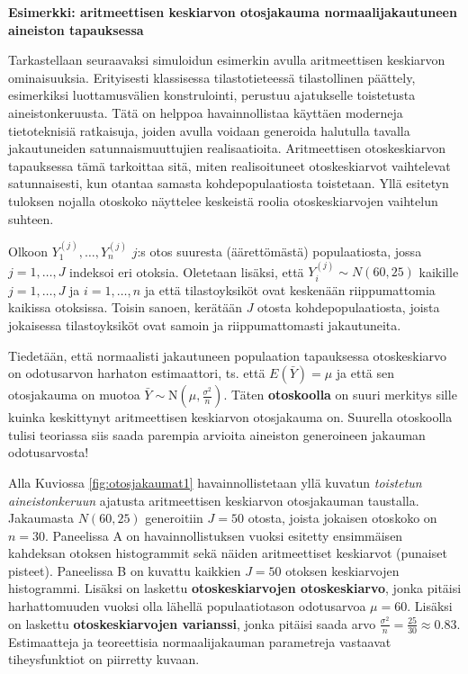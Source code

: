 \documentclass[
]{book}
\begin{document}
\begin{eblock}{}
\textbf{Esimerkki: aritmeettisen keskiarvon otosjakauma normaalijakautuneen aineiston tapauksessa}

Tarkastellaan seuraavaksi simuloidun esimerkin avulla aritmeettisen keskiarvon ominaisuuksia. Erityisesti klassisessa tilastotieteessä tilastollinen päättely, esimerkiksi luottamusvälien konstrulointi, perustuu ajatukselle toistetusta aineistonkeruusta. Tätä on helppoa havainnollistaa käyttäen moderneja tietoteknisiä ratkaisuja, joiden avulla voidaan generoida halutulla tavalla jakautuneiden satunnaismuuttujien realisaatioita. Aritmeettisen otoskeskiarvon tapauksessa tämä tarkoittaa sitä, miten realisoituneet otoskeskiarvot vaihtelevat satunnaisesti, kun otantaa samasta kohdepopulaatiosta toistetaan. Yllä esitetyn tuloksen nojalla otoskoko näyttelee keskeistä roolia otoskeskiarvojen vaihtelun suhteen.

Olkoon \(Y_1^{(j)},\dots,Y_n^{(j)}\) \(j\):s otos suuresta (äärettömästä) populaatiosta, jossa \(j=1,\dots,J\) indeksoi eri otoksia. Oletetaan lisäksi, että \(Y_i^{(j)} \sim N(60,25)\) kaikille \(j=1,\dots,J\) ja \(i=1,\dots,n\) ja että tilastoyksiköt ovat keskenään riippumattomia kaikissa otoksissa. Toisin sanoen, kerätään \(J\) otosta kohdepopulaatiosta, joista jokaisessa tilastoyksiköt ovat samoin ja riippumattomasti jakautuneita.

Tiedetään, että normaalisti jakautuneen populaation tapauksessa otoskeskiarvo on odotusarvon harhaton estimaattori, ts. että \(E(\bar{Y}) = \mu\) ja että sen otosjakauma on muotoa \(\bar{Y} \sim \text{N}(\mu,\frac{\sigma^2}{n})\). Täten \textbf{otoskoolla} on suuri merkitys sille kuinka keskittynyt aritmeettisen keskiarvon otosjakauma on. Suurella otoskoolla tulisi teoriassa siis saada parempia arvioita aineiston generoineen jakauman odotusarvosta!

Alla Kuviossa \ref{fig:otosjakaumat1} havainnollistetaan yllä kuvatun \emph{toistetun aineistonkeruun} ajatusta aritmeettisen keskiarvon otosjakauman taustalla. Jakaumasta \(N(60,25)\) generoitiin \(J=50\) otosta, joista jokaisen otoskoko on \(n=30\). Paneelissa A on havainnollistuksen vuoksi esitetty ensimmäisen kahdeksan otoksen histogrammit sekä näiden aritmeettiset keskiarvot (punaiset pisteet). Paneelissa B on kuvattu kaikkien \(J=50\) otoksen keskiarvojen histogrammi. Lisäksi on laskettu \textbf{otoskeskiarvojen otoskeskiarvo}, jonka pitäisi harhattomuuden vuoksi olla lähellä populaatiotason odotusarvoa \(\mu = 60\). Lisäksi on laskettu \textbf{otoskeskiarvojen varianssi}, jonka pitäisi saada arvo \(\frac{\sigma^2}{n} = \frac{25}{30} \approx 0.83\). Estimaatteja ja teoreettisia normaalijakauman parametreja vastaavat tiheysfunktiot on piirretty kuvaan.

\end{eblock}
\end{document}
